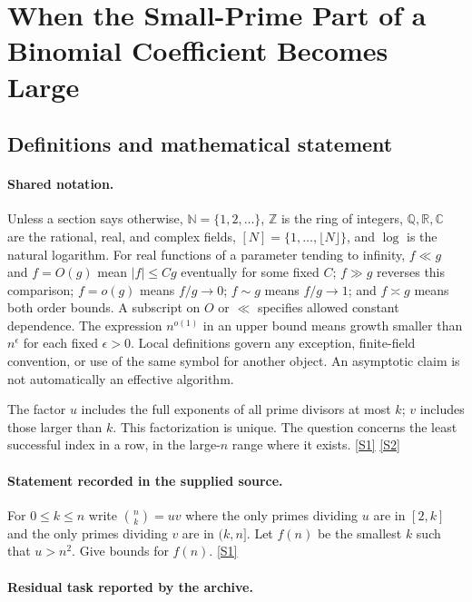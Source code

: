 \documentclass[11pt,a4paper]{article}
\newcommand{\N}{\mathbb{N}}
\newcommand{\Z}{\mathbb{Z}}
\newcommand{\Q}{\mathbb{Q}}
\newcommand{\R}{\mathbb{R}}
\newcommand{\C}{\mathbb{C}}
\newcommand{\sref}[2]{\hyperlink{source:#1:#2}{[S#2]}}
\begin{document}
\section{When the Small-Prime Part of a Binomial Coefficient Becomes Large}\label{statement}


\subsection{Definitions and mathematical statement}

\paragraph{Shared notation.}Unless a section says otherwise, $\N=\{1,2,\ldots\}$,
$\Z$ is the ring of integers, $\Q,\R,\C$ are the rational, real, and complex
fields, $[N]=\{1,\ldots,\lfloor N\rfloor\}$, and $\log$ is the natural
logarithm. For real functions of a parameter tending to infinity,
$f\ll g$ and $f=O(g)$ mean $|f|\leq Cg$ eventually for some fixed $C$;
$f\gg g$ reverses this comparison; $f=o(g)$ means $f/g\to0$;
$f\sim g$ means $f/g\to1$; and $f\asymp g$ means both order bounds.
A subscript on $O$ or $\ll$ specifies allowed constant dependence.
The expression $n^{o(1)}$ in an upper bound means growth smaller than
$n^\epsilon$ for each fixed $\epsilon>0$. Local definitions govern any
exception, finite-field convention, or use of the same symbol for another
object. An asymptotic claim is not automatically an effective algorithm.



The factor $u$ includes the full exponents of all prime divisors at most $k$; $v$ includes those larger than $k$. This factorization is unique. The question concerns the least successful index in a row, in the large-$n$ range where it exists. \sref{statement}{1} \sref{statement}{2}

\paragraph{Statement recorded in the supplied source.}
For $0\leq k\leq n$ write $ \binom{n}{k} = uv $ where the only primes dividing $u$ are in $[2,k]$ and the only primes dividing $v$ are in $(k,n]$.
Let $f(n)$ be the smallest $k$ such that $u>n^2$. Give bounds for $f(n)$. \sref{statement}{1}

\paragraph{Residual task reported by the archive.}
\end{document}
